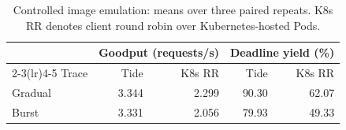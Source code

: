 \begin{table}[t]
\centering
\caption{Controlled image emulation: means over three paired repeats. K8s RR denotes client round robin over Kubernetes-hosted Pods.}
\label{tab:nj-image}
\footnotesize
\begin{tabular}{lrrrr}
\toprule
& \multicolumn{2}{c}{Goodput (requests/s)} & \multicolumn{2}{c}{Deadline yield (\%)} \\
\cmidrule(lr){2-3}\cmidrule(lr){4-5}
Trace & Tide & K8s RR & Tide & K8s RR \\
\midrule
Gradual & 3.344 & 2.299 & 90.30 & 62.07 \\
Burst & 3.331 & 2.056 & 79.93 & 49.33 \\
\bottomrule
\end{tabular}
\end{table}
